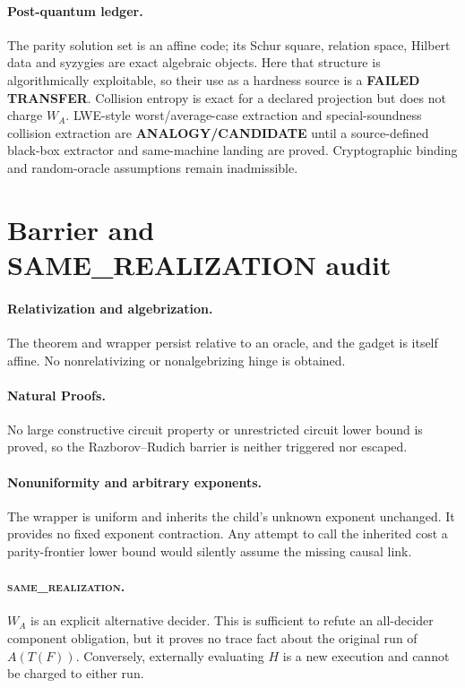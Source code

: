 \documentclass[11pt]{article}
\newcommand{\same}{\textsc{same\_realization}}
\begin{document}
\paragraph{Post-quantum ledger.}
The parity solution set is an affine code; its Schur square, relation space,
Hilbert data and syzygies are exact algebraic objects.  Here that structure is
algorithmically exploitable, so their use as a hardness source is a
\textbf{FAILED TRANSFER}.  Collision entropy is exact for a declared
projection but does not charge \(W_A\).  LWE-style worst/average-case
extraction and special-soundness collision extraction are
\textbf{ANALOGY/CANDIDATE} until a source-defined black-box extractor and
same-machine landing are proved.  Cryptographic binding and random-oracle
assumptions remain inadmissible.

\section{Barrier and SAME\_REALIZATION audit}

\paragraph{Relativization and algebrization.}
The theorem and wrapper persist relative to an oracle, and the gadget is
itself affine.  No nonrelativizing or nonalgebrizing hinge is obtained.

\paragraph{Natural Proofs.}
No large constructive circuit property or unrestricted circuit lower bound
is proved, so the Razborov--Rudich barrier is neither triggered nor escaped.

\paragraph{Nonuniformity and arbitrary exponents.}
The wrapper is uniform and inherits the child's unknown exponent unchanged.
It provides no fixed exponent contraction.  Any attempt to call the inherited
cost a parity-frontier lower bound would silently assume the missing causal
link.

\paragraph{\same.}
\(W_A\) is an explicit alternative decider.  This is sufficient to refute an
all-decider component obligation, but it proves no trace fact about the
original run of \(A(T(F))\).  Conversely, externally evaluating \(H\) is a
new execution and cannot be charged to either run.
\end{document}
